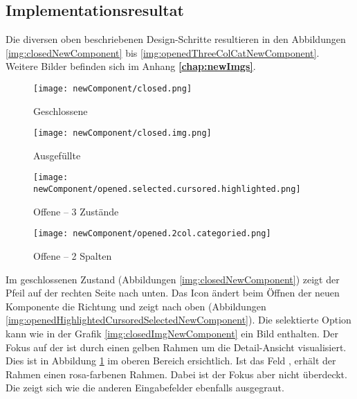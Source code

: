 \subsection{Implementationsresultat}
\label{sec:designImplementation}

Die diversen oben beschriebenen Design-Schritte resultieren in den Abbildungen \ref{img:closedNewComponent} bis \ref{img:openedThreeColCatNewComponent}. 
Weitere Bilder befinden sich im Anhang \textbf{\ref{chap:newImgs}}. 

\begin{figure}[!htb]
    \centering
    \begin{minipage}[b]{0.3\textwidth}
        \centering
        \begin{minipage}[t]{\textwidth}
            \centering
            \texttt{[image: newComponent/closed.png]}
            \caption{\centering Geschlossene }
            \label{img:closedNewComponent}
        \end{minipage}
        \vspace{0.6cm}\newline
        \begin{minipage}[b]{\textwidth}
            \centering
            \texttt{[image: newComponent/closed.img.png]}
            \caption{\centering Ausgefüllte }
            \label{img:closedImgNewComponent}
        \end{minipage}
        \newline
    \end{minipage}
    \hfill
    \begin{minipage}[b]{0.35\textwidth}
        \centering
        \texttt{[image: newComponent/opened.selected.cursored.highlighted.png]}
        \caption{\centering Offene  – 3 Zustände}
        \label{img:openedHighlightedCursoredSelectedNewComponent}
    \end{minipage}
    \hfill
    \begin{minipage}[b]{0.25\textwidth}
        \centering
        \texttt{[image: newComponent/opened.2col.categoried.png]}
        \caption{\centering Offene  – 2 Spalten}
        \label{img:openedTwoColCatNewComponent}
    \end{minipage}
\end{figure}

Im geschlossenen Zustand (Abbildungen \ref{img:closedNewComponent}) zeigt der Pfeil auf der rechten Seite nach unten. 
Das Icon ändert beim Öffnen der neuen Komponente die Richtung und zeigt nach oben (Abbildungen \ref{img:openedHighlightedCursoredSelectedNewComponent}). 
Die selektierte Option kann wie in der Grafik \ref{img:closedImgNewComponent} ein Bild enthalten. 
Der Fokus auf der  ist durch einen gelben Rahmen um die Detail-Ansicht visualisiert. 
Dies ist in Abbildung \ref{img:openedTwoColCatNewComponent} im oberen Bereich ersichtlich. 
Ist das Feld , erhält der Rahmen einen rosa-farbenen Rahmen. 
Dabei ist der Fokus aber nicht überdeckt. 
Die   zeigt sich wie die anderen Eingabefelder ebenfalls ausgegraut. 

